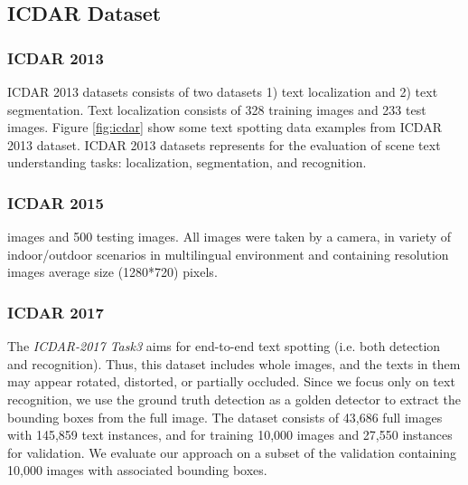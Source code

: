 \documentclass[phd,tocprelim]{cornell}
\begin{document}
\subsection{ICDAR Dataset}

\subsubsection{ICDAR 2013 \cite{lucas2003icdar}}
ICDAR 2013 datasets consists of two datasets 1) text localization and 2) text segmentation. Text localization consists of 328 training images and 233 test images. Figure \ref{fig:icdar} show some text spotting data examples from ICDAR 2013 dataset. ICDAR 2013 datasets represents for the evaluation of scene text understanding tasks: localization, segmentation, and recognition.

\subsubsection{ICDAR 2015}
images and 500 testing images. All images were taken by a camera, in variety of indoor/outdoor scenarios in multilingual environment and containing resolution images average size (1280*720) pixels.



\subsubsection{ICDAR 2017  \cite{veit2016coco} }
 
 
 The \textit{ICDAR-2017 Task3} aims for end-to-end text spotting (i.e. both detection and recognition). Thus, this dataset includes whole images, and the texts in them may appear rotated, distorted, or partially occluded. Since we focus only on text recognition, we use the ground truth detection as a golden detector to extract the bounding boxes from the full image. The dataset consists of 43,686 full images with 145,859 text instances, and for training 10,000 images and 27,550 instances for validation. We evaluate our approach on a subset of the validation containing 10,000 images with associated bounding boxes.
 


\end{document}
